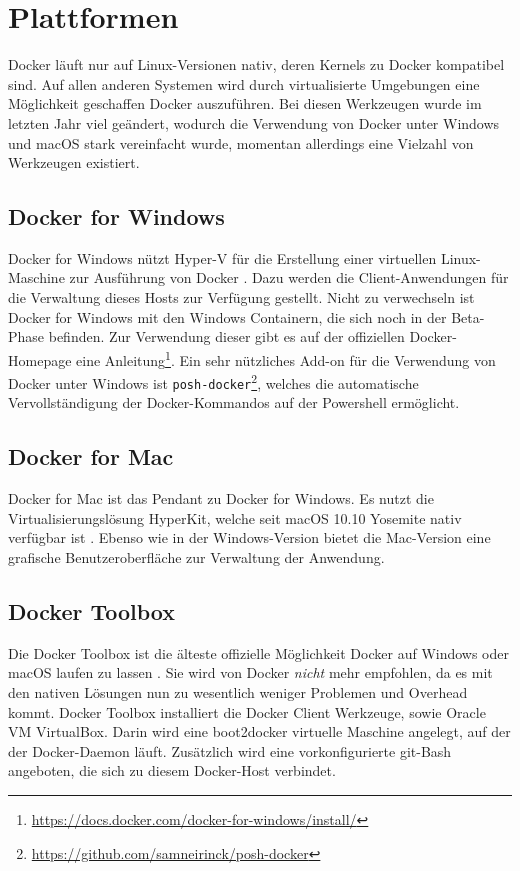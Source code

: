 \section{Plattformen}
\label{sec:docker-platforms}
Docker läuft nur auf Linux-Versionen nativ, deren Kernels zu Docker kompatibel sind.
Auf allen anderen Systemen wird durch virtualisierte Umgebungen eine Möglichkeit geschaffen Docker auszuführen.
Bei diesen Werkzeugen wurde im letzten Jahr viel geändert, wodurch die Verwendung von Docker unter Windows und macOS stark vereinfacht wurde, momentan allerdings eine Vielzahl von Werkzeugen existiert.

\subsection{Docker for Windows}
\label{sec:docker-windows}
Docker for Windows nützt Hyper-V für die Erstellung einer virtuellen Linux-Maschine zur Ausführung von Docker \autocite{docker-for-windows:online}.
Dazu werden die Client-Anwendungen für die Verwaltung dieses Hosts zur Verfügung gestellt.
Nicht zu verwechseln ist Docker for Windows mit den Windows Containern, die sich noch in der Beta-Phase befinden.
Zur Verwendung dieser gibt es auf der offiziellen Docker-Homepage eine Anleitung\footnote{\url{https://docs.docker.com/docker-for-windows/install/}}.
Ein sehr nützliches Add-on für die Verwendung von Docker unter Windows ist \lstinline{posh-docker}\footnote{\url{https://github.com/samneirinck/posh-docker}}, welches die automatische Vervollständigung der Docker-Kommandos auf der Powershell ermöglicht.

\subsection{Docker for Mac}
\label{sec:docker-mac}
Docker for Mac ist das Pendant zu Docker for Windows.
Es nutzt die Virtualisierungslösung HyperKit, welche seit macOS 10.10 Yosemite nativ verfügbar ist \autocite{docker-for-mac:online}.
Ebenso wie in der Windows-Version bietet die Mac-Version eine grafische Benutzeroberfläche zur Verwaltung der Anwendung.

\subsection{Docker Toolbox}
\label{sec:docker-toolbox}
Die Docker Toolbox ist die älteste offizielle Möglichkeit Docker auf Windows oder macOS laufen zu lassen \autocite{docker-toolbox:online}.
Sie wird von Docker \emph{nicht} mehr empfohlen, da es mit den nativen Lösungen nun zu wesentlich weniger Problemen und Overhead kommt.
Docker Toolbox installiert die Docker Client Werkzeuge, sowie Oracle VM VirtualBox.
Darin wird eine boot2docker virtuelle Maschine angelegt, auf der der Docker-Daemon läuft.
Zusätzlich wird eine vorkonfigurierte git-Bash angeboten, die sich zu diesem Docker-Host verbindet.

